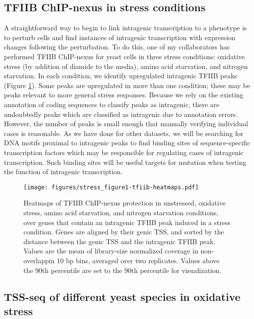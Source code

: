 \documentclass[9pt, letterpaper]{article}
\begin{document}
\subsection{TFIIB ChIP-nexus in stress conditions}

A straightforward way to begin to link intragenic transcription to a phenotype is to perturb cells and find instances of intragenic transcription with expression changes following the perturbation. To do this, one of my collaborators has performed TFIIB ChIP-nexus for yeast cells in three stress conditions: oxidative stress (by addition of diamide to the media), amino acid starvation, and nitrogen starvation. In each condition, we identify upregulated intragenic TFIIB peaks (Figure \ref{fig:stress_tfiib-heatmaps}). Some peaks are upregulated in more than one condition; these may be peaks relevant to more general stress responses. Because we rely on the existing annotation of coding sequences to classify peaks as intragenic, there are undoubtedly peaks which are classified as intragenic due to annotation errors. However, the number of peaks is small enough that manually verifying individual cases is reasonable. As we have done for other datasets, we will be searching for DNA motifs proximal to intragenic peaks to find binding sites of sequence-specific transcription factors which may be responsible for regulating cases of intragenic transcription. Such binding sites will be useful targets for mutation when testing the function of intragenic transcription.

\begin{figure}[H]
\centering
\texttt{[image: figures/stress\_figure1-tfiib-heatmaps.pdf]}
\caption{Heatmaps of TFIIB ChIP-nexus protection in unstressed, oxidative stress, amino acid starvation, and nitrogen starvation conditions, over genes that contain an intragenic TFIIB peak induced in a stress condition. Genes are aligned by their genic TSS, and sorted by the distance between the genic TSS and the intragenic TFIIB peak. Values are the mean of library-size normalized coverage in non-overlappin 10 bp bins, averaged over two replicates. Values above the 90th percentile are set to the 90th percentile for visualization.}
\label{fig:stress_tfiib-heatmaps}
\end{figure}

\subsection{TSS-seq of different yeast species in oxidative stress}
\end{document}
